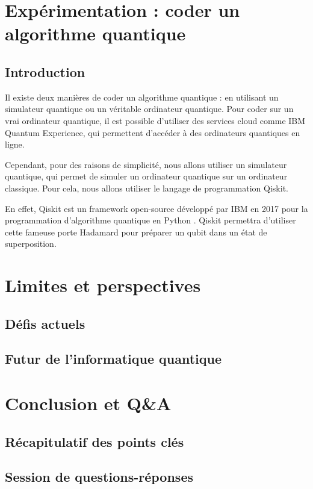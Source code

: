 \documentclass{article}
\begin{document}
\section{Expérimentation : coder un algorithme quantique}

\subsection{Introduction}

Il existe deux manières de coder un algorithme quantique : en utilisant un simulateur quantique
ou un véritable ordinateur quantique. Pour coder sur un vrai ordinateur quantique, il est possible
d'utiliser des services cloud comme IBM Quantum Experience, qui permettent d'accéder à des
ordinateurs quantiques en ligne. \cite{wikipediaQuantumPlatform}

Cependant, pour des raisons de simplicité, nous allons utiliser un simulateur quantique, qui
permet de simuler un ordinateur quantique sur un ordinateur classique. Pour cela, nous allons
utiliser le langage de programmation Qiskit.

En effet, Qiskit est un framework open-source développé par IBM en 2017 pour la programmation
d'algorithme quantique en Python \cite{wikipediaQiskitWikipedia}. Qiskit permettra d'utiliser cette fameuse 
porte Hadamard pour préparer un qubit dans un état de superposition.

\section{Limites et perspectives}
\subsection{Défis actuels}
\subsection{Futur de l'informatique quantique}

\section{Conclusion et Q\&A}
\subsection{Récapitulatif des points clés}
\subsection{Session de questions-réponses}

\break\printbibliography
\end{document}
